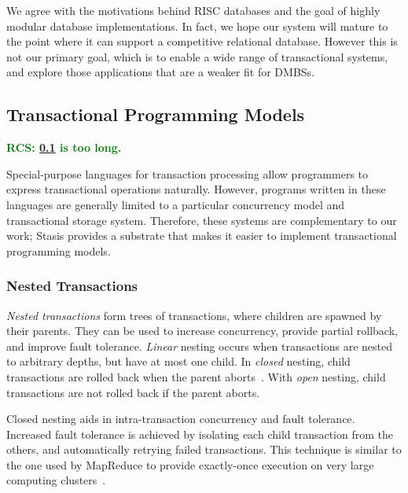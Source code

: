 \documentclass[letterpaper,twocolumn,10pt]{article}
\newcommand{\yad}{Stasis\xspace}
\newcommand{\rcs}[1]{\textcolor{green}{\bf RCS: #1}}
\begin{document}
We agree with the motivations behind RISC databases and the goal
of highly modular database implementations.  In fact, we  hope
 our system will mature to the point where it can support a
competitive relational database.  However this is not our primary
goal, which is to enable a wide range of transactional systems, and
explore those applications that are a weaker fit for DMBSs.




\subsection{Transactional Programming Models}

\label{sec:transactionalProgramming}

\rcs{\ref{sec:transactionalProgramming} is too long.}

Special-purpose languages for transaction processing allow programmers
to express transactional operations naturally.  However, programs
written in these languages are generally limited to a particular
concurrency model and transactional storage system.  Therefore, these
systems are complementary to our work; \yad provides a substrate that makes
it easier to implement transactional programming models.

\subsubsection{Nested Transactions}

{\em Nested transactions} form trees of transactions, where children
are spawned by their parents.  They can be used to increase
concurrency, provide partial rollback, and improve fault tolerance.
{\em Linear} nesting occurs when transactions are nested to arbitrary
depths, but have at most one child.  In {\em closed} nesting, child
transactions are rolled back when the parent
aborts~\cite{nestedTransactionBook}.  With {\em open} nesting, child
transactions are not rolled back if the parent aborts.  

Closed nesting aids in intra-transaction concurrency and fault
tolerance.  Increased fault tolerance is achieved by isolating each
child transaction from the others, and automatically retrying failed
transactions.  This technique is similar to the one used by MapReduce
to provide exactly-once execution on very large computing 
clusters~\cite{mapReduce}.
\end{document}
